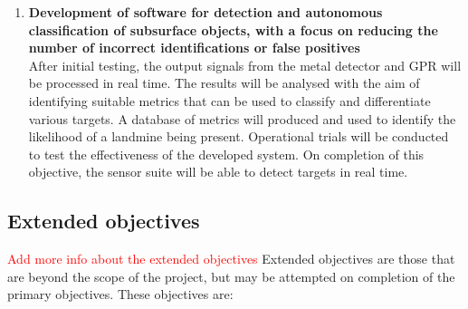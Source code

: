 \documentclass[main.tex]{subfiles}
\begin{document}
\begin{enumerate}
\item \textbf{Development of software for detection and autonomous classification of subsurface objects, with a focus on reducing the number of incorrect identifications or false positives}\\ After initial testing, the output signals from the metal detector and GPR will be processed in real time. The results will be analysed with the aim of identifying suitable metrics that can be used to classify and differentiate various targets. A database of metrics will produced and used to identify the likelihood of a landmine being present. Operational trials will be conducted to test the effectiveness of the developed system. On completion of this objective, the sensor suite will be able to detect targets in real time.
\end{enumerate}

\subsection{Extended objectives}
\textcolor{red}{Add more info about the extended objectives}
Extended objectives are those that are beyond the scope of the project, but may be attempted on completion of the primary objectives. These objectives are:
\end{document}
